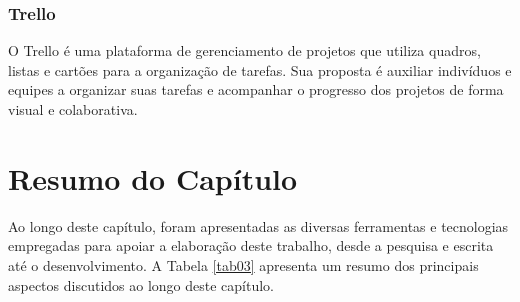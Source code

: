 \subsubsection{Trello}
\label{sec:Trello}
O Trello \cite{trello} é uma plataforma de gerenciamento de projetos que utiliza quadros, listas e cartões para a organização de tarefas. Sua proposta é auxiliar indivíduos e equipes a organizar suas tarefas e acompanhar o progresso 
dos projetos de forma visual e colaborativa.

\section{Resumo do Capítulo}
\label{sec:Resumo do Capítulo 2}
Ao longo deste capítulo, foram apresentadas as diversas ferramentas e tecnologias empregadas para apoiar a elaboração deste trabalho, desde a pesquisa e escrita até o desenvolvimento. 
A Tabela \ref{tab03} apresenta um resumo dos principais aspectos discutidos ao longo deste capítulo.

